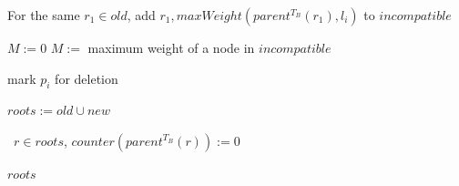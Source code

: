 \documentclass{article}
\newcommand{\leafset}{\Lambda}
\begin{document}
\begin{algorithm}
\begin{algorithmic}[1]
                    \State For the same $r_1 \in old$, add $r_1, maxWeight(parent^{T_B}(r_1), l_i)$ to $incompatible$
                \EndIf

                    {$M := 0$}
                    $M :=$ maximum weight of a node in $incompatible$

                \IIf{$w(\leafset(T_A[p_i])) \leq M$}
                    mark $p_i$ for deletion

                \State $roots := old \cup new$
            \EndFor

            \State \algorithmicforall\ $r \in roots$, $counter(parent^{T_B}(r)) := 0$

            \State \Return $roots$
        \end{algorithmic}
    \end{algorithm}
\end{document}
